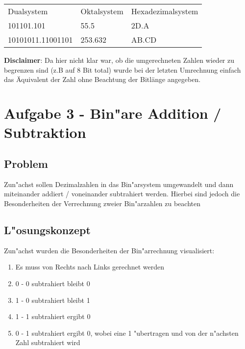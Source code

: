 \documentclass[a4paper,11pt,titlepage]{article}
\begin{document}
    \\ \\

    \begin{table}
        \centering
        \begin{tabular}{lll}
            Dualsystem        & Oktalsystem & Hexadezimalsystem \\
            101101.101        & 55.5        & 2D.A              \\
            10101011.11001101 & 253.632     & AB.CD             \\
        \end{tabular}
    \end{table}

    \noindent \textbf{Disclaimer}: Da hier nicht klar war, ob die umgerechneten Zahlen wieder zu begrenzen sind (z.B auf 8 Bit total) wurde bei der letzten Umrechnung einfach das Äquivalent der Zahl ohne Beachtung der Bitlänge angegeben.


    \section{Aufgabe 3 - Bin"are Addition / Subtraktion}

    \subsection{Problem}
    Zun"achst sollen Dezimalzahlen in das Bin"arsystem umgewandelt und dann miteinander addiert / voneinander subtrahiert werden. Hierbei sind jedoch die Besonderheiten der Verrechnung zweier Bin"arzahlen zu beachten

    \subsection{L"osungskonzept}
    Zun"achst wurden die Besonderheiten der Bin"arrechnung visualisiert:

    \begin{enumerate}
        \item Es muss von Rechts nach Links gerechnet werden
        \item 0 - 0 subtrahiert bleibt 0
        \item 1 - 0 subtrahiert bleibt 1
        \item 1 - 1 subtrahiert ergibt 0
        \item 0 - 1 subtrahiert ergibt 0, wobei eine 1 "ubertragen und von der n"achsten Zahl subtrahiert wird
    \end{enumerate}
\end{document}
